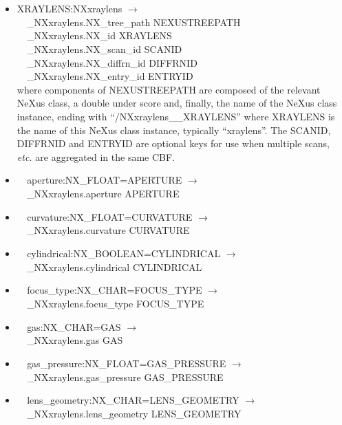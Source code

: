 \documentclass[11pt]{article}
\begin{document}
{{\begin{itemize}

\item{XRAYLENS:NXxraylens $\rightarrow$\\
\verb|  |\_NXxraylens.NX\_tree\_path    NEXUSTREEPATH \\
\verb|  |\_NXxraylens.NX\_id            XRAYLENS \\
\verb|  |\_NXxraylens.NX\_scan\_id      SCANID \\
\verb|  |\_NXxraylens.NX\_diffrn\_id    DIFFRNID \\
\verb|  |\_NXxraylens.NX\_entry\_id     ENTRYID \\
where components of NEXUSTREEPATH are composed of the
relevant NeXus class, a double under score and, finally, the
name of the NeXus class instance, ending with ``/NXxraylens\_\_XRAYLENS''
where XRAYLENS is the name of this NeXus class instance, typically ``xraylens''.
The SCANID, DIFFRNID and ENTRYID are optional keys for use
when multiple scans, {\it etc.} are aggregated in the same CBF.}

\item{\verb|  |aperture:NX\_FLOAT=APERTURE $\rightarrow$\\
\verb|  |\_NXxraylens.aperture APERTURE}

\item{\verb|  |curvature:NX\_FLOAT=CURVATURE $\rightarrow$\\
\verb|  |\_NXxraylens.curvature CURVATURE}

\item{\verb|  |cylindrical:NX\_BOOLEAN=CYLINDRICAL $\rightarrow$\\
\verb|  |\_NXxraylens.cylindrical CYLINDRICAL}

\item{\verb|  |focus\_type:NX\_CHAR=FOCUS\_TYPE $\rightarrow$\\
\verb|  |\_NXxraylens.focus\_type FOCUS\_TYPE}

\item{\verb|  |gas:NX\_CHAR=GAS $\rightarrow$\\
\verb|  |\_NXxraylens.gas GAS}

\item{\verb|  |gas\_pressure:NX\_FLOAT=GAS\_PRESSURE $\rightarrow$\\
\verb|  |\_NXxraylens.gas\_pressure GAS\_PRESSURE}

\item{\verb|  |lens\_geometry:NX\_CHAR=LENS\_GEOMETRY $\rightarrow$\\
\verb|  |\_NXxraylens.lens\_geometry LENS\_GEOMETRY}


\end{itemize}}}
\end{document}
